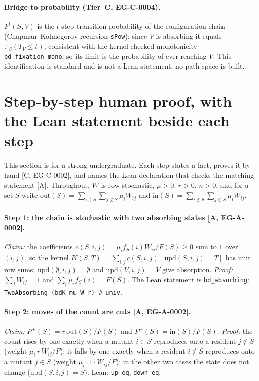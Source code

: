 \documentclass[11pt]{article}
\newcommand{\tier}[1]{\textsf{[#1]}}
\newcommand{\lean}[1]{\texttt{#1}}
\begin{document}
\paragraph{Bridge to probability (Tier~C, EG-C-0004).} $P^t(S,V)$ is the $t$-step transition probability of the configuration chain (Chapman--Kolmogorov recursion \lean{sPow}); since $V$ is absorbing it equals $\mathbb P_S(T_V\le t)$, consistent with the kernel-checked monotonicity \lean{bd\_fixation\_mono}, so its limit is the probability of ever reaching $V$. This identification is standard and is not a Lean statement; no path space is built.

\section{Step-by-step human proof, with the Lean statement beside each step}\label{sec:human}
This section is for a strong undergraduate. Each step states a fact, proves it by hand \tier{C, EG-C-0002}, and names the Lean declaration that checks the matching statement \tier{A}.
Throughout, $W$ is row-stochastic, $\mu>0$, $r>0$, $n>0$, and for a set $S$ write $\mathrm{out}(S)=\sum_{i\in S}\sum_{j\notin S}\mu_iW_{ij}$ and $\mathrm{in}(S)=\sum_{i\notin S}\sum_{j\in S}\mu_iW_{ij}$.

\paragraph{Step 1: the chain is stochastic with two absorbing states \tier{A, EG-A-0002}.} \emph{Claim:} the coefficients $c(S,i,j)=\mu_if_S(i)W_{ij}/F(S)\ge0$ sum to $1$ over $(i,j)$, so the kernel $K(S,T)=\sum_{i,j}c(S,i,j)\,[\mathrm{upd}(S,i,j)=T]$ has unit row sums; $\mathrm{upd}(\emptyset,i,j)=\emptyset$ and $\mathrm{upd}(V,i,j)=V$ give absorption. \emph{Proof:} $\sum_j W_{ij}=1$ and $\sum_i\mu_if_S(i)=F(S)$. The Lean statement is \lean{bd\_absorbing}: \lean{TwoAbsorbing (bdK mu W r) $\emptyset$ univ}.

\paragraph{Step 2: moves of the count are cuts \tier{A, EG-A-0002}.} \emph{Claim:} $P^{+}(S)=r\,\mathrm{out}(S)/F(S)$ and $P^{-}(S)=\mathrm{in}(S)/F(S)$. \emph{Proof:} the count rises by one exactly when a mutant $i\in S$ reproduces onto a resident $j\notin S$ (weight $\mu_i\,r\,W_{ij}/F$); it falls by one exactly when a resident $i\notin S$ reproduces onto a mutant $j\in S$ (weight $\mu_i\cdot1\cdot W_{ij}/F$); in the other two cases the state does not change ($\mathrm{upd}(S,i,j)=S$).
Lean: \lean{up\_eq}, \lean{down\_eq}.
\end{document}
